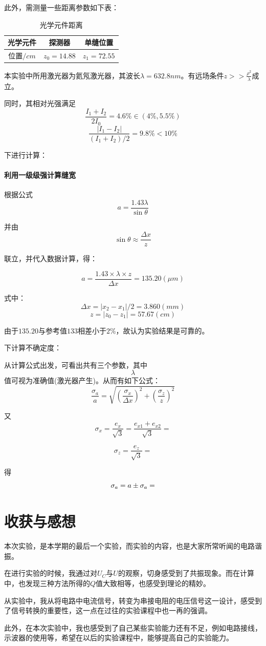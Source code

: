 \documentclass{ctexart}
\begin{document}
  此外，需测量一些距离参数如下表：
\begin{table}[htbp]
  \centering
  \caption{光学元件距离}
    \begin{tabular}{|c|c|c|}\hline
    光学元件  & {探测器} & {单缝位置} \\ \hline
    位置$/cm$ & $z_0=14.88$ & $z_1=72.55$ \\\hline
    \end{tabular}%
  \label{tab:addlabel}%
\end{table}%



本实验中所用激光器为氦氖激光器，其波长$\lambda=632.8nm$。有远场条件$z>>\frac{\rho^2}{\lambda}$成立。

同时，其相对光强满足$$\frac{I_1+I_2}{2I_0}=4.6\%\in(4\%,5.5\%)$$
$$\frac{|I_1-I_2|}{(I_1+I_2)/2}=9.8\%<10\%$$

下进行计算：
\paragraph{利用一级级强计算缝宽}
根据公式
$$a=\frac{1.43\lambda}{\sin{\theta}}$$

并由$$\sin{\theta}\approx \frac{\Delta x}{z}$$

联立，并代入数据计算，得：

$$a=\frac{1.43 \times \lambda \times z}{\Delta x}=135.20(\mu m)$$


式中：$$\Delta x=|x_2-x_1|/2=3.860(mm)$$
$$z=|z_0-z_1|=57.67(cm)$$

由于$135.20\mbox{与参考值}133\mbox{相差小于}2\%$，故认为实验结果是可靠的。

下计算不确定度：

从计算公式出发，可看出共有三个参数，其中$$\lambda$$值可视为准确值(激光器产生)。从而有如下公式：
$$\frac{\sigma_a}a=\sqrt{(\frac{\sigma_x}{\Delta x})^2+(\frac{\sigma_z}z)^2}$$

又$$\sigma_x=\frac{e_x}{\sqrt{3}}=\frac{e_{x1}+e_{x2}}{\sqrt{3}}=$$

$$\sigma_z=\frac{e_z}{\sqrt{3}}=$$

得$$\sigma_a= \\ a \pm \sigma_a=$$


      \section{收获与感想}
      本次实验，是本学期的最后一个实验，而实验的内容，也是大家所常听闻的电路谐振。

      在进行实验的时候，我通过对$U_C$与$U$的观察，切身感受到了共振现象。而在计算中，也发现三种方法所得的$Q$值大致相等，也感受到理论的精妙。

      从实验中，我从将电路中电流信号，转变为串接电阻的电压信号这一设计，感受到了信号转换的重要性，这一点在过往的实验课程中也一再的强调。

      此外，在本次实验中，我也感受到了自己某些实验能力还有不足，例如电路接线，示波器的使用等，希望在以后的实验课程中，能够提高自己的实验能力。
\end{document}
